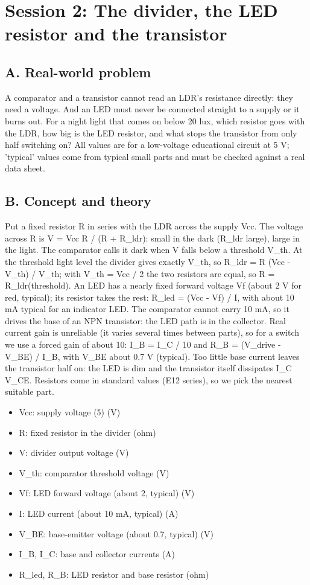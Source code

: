 \documentclass[11pt,a4paper]{article}
\begin{document}
\section{Session 2: The divider, the LED resistor and the transistor}

\subsection*{A. Real-world problem}
A comparator and a transistor cannot read an LDR's resistance directly: they need a voltage. And an LED must never be connected straight to a supply or it burns out. For a night light that comes on below 20 lux, which resistor goes with the LDR, how big is the LED resistor, and what stops the transistor from only half switching on? All values are for a low-voltage educational circuit at 5 V; 'typical' values come from typical small parts and must be checked against a real data sheet.

\subsection*{B. Concept and theory}
Put a fixed resistor R in series with the LDR across the supply Vcc. The voltage across R is V = Vcc R / (R + R\_ldr): small in the dark (R\_ldr large), large in the light. The comparator calls it dark when V falls below a threshold V\_th. At the threshold light level the divider gives exactly V\_th, so R\_ldr = R (Vcc - V\_th) / V\_th; with V\_th = Vcc / 2 the two resistors are equal, so R = R\_ldr(threshold). An LED has a nearly fixed forward voltage Vf (about 2 V for red, typical); its resistor takes the rest: R\_led = (Vcc - Vf) / I, with about 10 mA typical for an indicator LED. The comparator cannot carry 10 mA, so it drives the base of an NPN transistor: the LED path is in the collector. Real current gain is unreliable (it varies several times between parts), so for a switch we use a forced gain of about 10: I\_B = I\_C / 10 and R\_B = (V\_drive - V\_BE) / I\_B, with V\_BE about 0.7 V (typical). Too little base current leaves the transistor half on: the LED is dim and the transistor itself dissipates I\_C V\_CE. Resistors come in standard values (E12 series), so we pick the nearest suitable part.

\begin{itemize}[nosep]
\item Vcc: supply voltage (5) (V)
\item R: fixed resistor in the divider (ohm)
\item V: divider output voltage (V)
\item V\_th: comparator threshold voltage (V)
\item Vf: LED forward voltage (about 2, typical) (V)
\item I: LED current (about 10 mA, typical) (A)
\item V\_BE: base-emitter voltage (about 0.7, typical) (V)
\item I\_B, I\_C: base and collector currents (A)
\item R\_led, R\_B: LED resistor and base resistor (ohm)
\end{itemize}
\end{document}
